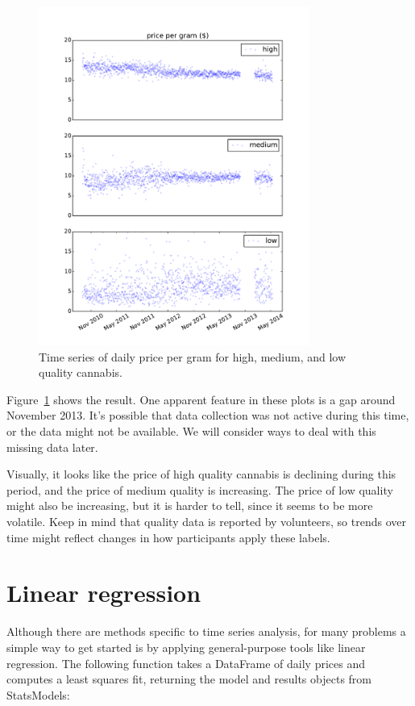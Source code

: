 \documentclass[12pt]{book}
\begin{document}
\begin{figure}
\centerline{\includegraphics[width=3.5in]{figs/timeseries1.pdf}}
\caption{Time series of daily price per gram for high, medium, and low
quality cannabis.}
\label{timeseries1}
\end{figure}

Figure~\ref{timeseries1} shows the result.  One apparent feature in
these plots is a gap around November 2013.  It's possible that data
collection was not active during this time, or the data might not
be available.  We will consider ways to deal with this missing data
later.

Visually, it looks like the price of high quality cannabis is
declining during this period, and the price of medium quality is
increasing.  The price of low quality might also be increasing, but it
is harder to tell, since it seems to be more volatile.  Keep in mind
that quality data is reported by volunteers, so trends over time
might reflect changes in how participants apply these labels.


\section{Linear regression}
\label{timeregress}

Although there are methods specific to time series analysis, for many
problems a simple way to get started is by applying general-purpose
tools like linear regression.  The following function takes a
DataFrame of daily prices and computes a least squares fit, returning
the model and results objects from StatsModels:
\end{document}
